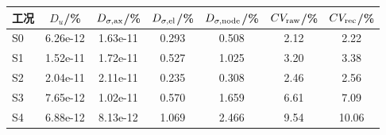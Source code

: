 \begin{tabular}{@{}lS[table-format=1.2e-2]S[table-format=1.2e-2]S[table-format=1.3]S[table-format=1.3]S[table-format=2.2]S[table-format=2.2]@{}}
\toprule
工况 & {$D_u$/\%} & {$D_{\sigma,\rm ax}$/\%} & {$D_{\sigma,\rm el}$/\%} & {$D_{\sigma,\rm node}$/\%} & {$CV_{\rm raw}$/\%} & {$CV_{\rm rec}$/\%} \\
\midrule
S0 & 6.26e-12 & 1.63e-11 & 0.293 & 0.508 & 2.12 & 2.22 \\
S1 & 1.52e-11 & 1.72e-11 & 0.527 & 1.025 & 3.20 & 3.38 \\
S2 & 2.04e-11 & 2.11e-11 & 0.235 & 0.308 & 2.46 & 2.56 \\
S3 & 7.65e-12 & 1.02e-11 & 0.570 & 1.659 & 6.61 & 7.09 \\
S4 & 6.88e-12 & 8.13e-12 & 1.069 & 2.466 & 9.54 & 10.06 \\
\bottomrule
\end{tabular}
